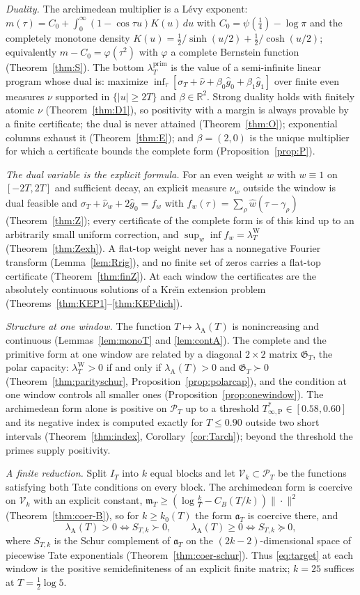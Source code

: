\documentclass[11pt]{amsart}
\theoremstyle{definition}
\theoremstyle{remark}
\newcommand{\R}{\mathbb R}
\newcommand{\PT}{\mathcal P_T}
\newcommand{\IT}{I_T}
\newcommand{\lamP}{\lambda^{\mathrm{prim}}_T}
\newcommand{\lamW}{\lambda^{\mathrm W}_T}
\newcommand{\lamA}{\lambda_{\mathrm A}(T)}
\newcommand{\sT}{\sigma_T}
\newcommand{\gh}[1]{\widehat g_{#1}}
\newcommand{\nuh}{\widehat\nu}
\newcommand{\wh}{\widehat w}
\begin{document}
\emph{Duality.} The archimedean multiplier is a L\'evy exponent:
$m(\tau)=C_0+\int_0^\infty(1-\cos\tau u)K(u)\,du$ with $C_0=\psi(\frac14)-\log\pi$ and the completely
monotone density $K(u)=\frac12/\sinh(u/2)+\frac12/\cosh(u/2)$; equivalently $m-C_0=\varphi(\tau^2)$ with
$\varphi$ a complete Bernstein function (Theorem~\ref{thm:S}). The bottom $\lamP$ is the value of a
semi-infinite linear program whose dual is: maximize $\inf_\tau[\sT+\nuh+\beta_0\gh0+\beta_1\gh1]$ over
finite even measures $\nu$ supported in $\{|u|\ge2T\}$ and $\beta\in\R^2$. Strong duality holds with
finitely atomic $\nu$ (Theorem~\ref{thm:D1}), so positivity with a margin is always provable by a finite
certificate; the dual is never attained (Theorem~\ref{thm:O}); exponential columns exhaust it
(Theorem~\ref{thm:E}); and $\beta=(2,0)$ is the unique multiplier for which a certificate bounds the
complete form (Proposition~\ref{prop:P}).

\emph{The dual variable is the explicit formula.} For an even weight $w$ with $w\equiv1$ on $[-2T,2T]$
and sufficient decay, an explicit measure $\nu_w$ outside the window is dual feasible and
$\sT+\nuh_w+2\gh0=f_w$ with $f_w(\tau)=\sum_\rho\wh(\tau-\gamma_\rho)$ (Theorem~\ref{thm:Z}); every
certificate of the complete form is of this kind up to an arbitrarily small uniform correction, and
$\sup_w\inf f_w=\lamW$ (Theorem~\ref{thm:Zexh}). A flat-top weight never has a nonnegative Fourier
transform (Lemma~\ref{lem:Rrig}), and no finite set of zeros carries a flat-top certificate
(Theorem~\ref{thm:finZ}). At each window the certificates are the absolutely continuous solutions of a
Kre\u{\i}n extension problem (Theorems~\ref{thm:KEP1}--\ref{thm:KEPdich}).

\emph{Structure at one window.} The function $T\mapsto\lamA$ is nonincreasing and continuous
(Lemmas~\ref{lem:monoT} and \ref{lem:contA}). The complete and the primitive form at one window are related
by a diagonal $2\times2$ matrix $\mathfrak G_T$, the polar capacity: $\lamW>0$ if and only if $\lamA>0$
and $\mathfrak G_T\succ0$ (Theorem~\ref{thm:parityschur}, Proposition~\ref{prop:polarcap}), and the
condition at one window controls all smaller ones (Proposition~\ref{prop:onewindow}). The archimedean form
alone is positive on $\PT$ up to a threshold $T^*_{\infty,\mathrm P}\in[0.58,0.60]$ and its negative index
is computed exactly for $T\le0.90$ outside two short intervals (Theorem~\ref{thm:index},
Corollary~\ref{cor:Tarch}); beyond the threshold the primes supply positivity.

\emph{A finite reduction.} Split $\IT$ into $k$ equal blocks and let $\mathcal V_k\subset\PT$ be the
functions satisfying both Tate conditions on every block. The archimedean form is coercive on
$\mathcal V_k$ with an explicit constant, $\mathfrak m_T\ge(\log\frac kT-C_B(T/k))\|\cdot\|^2$
(Theorem~\ref{thm:coer-B}), so for $k\ge k_0(T)$ the form $\mathfrak a_T$ is coercive there, and
\[
\lamA>0\iff S_{T,k}\succ0,\qquad \lamA\ge0\iff S_{T,k}\succeq0,
\]
where $S_{T,k}$ is the Schur complement of $\mathfrak a_T$ on the $(2k-2)$-dimensional space of piecewise
Tate exponentials (Theorem~\ref{thm:coer-schur}). Thus \eqref{eq:target} at each window is the positive
semidefiniteness of an explicit finite matrix; $k=25$ suffices at $T=\frac12\log5$.
\end{document}
